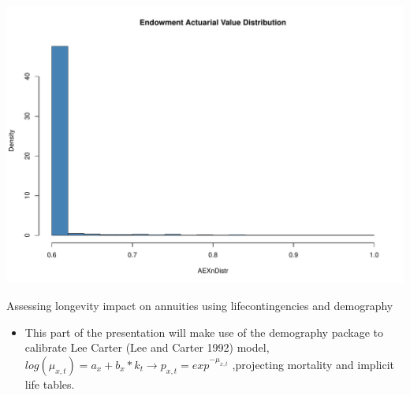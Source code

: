 \begin{frame}

\includegraphics{introToLifecontingencies_files/figure-beamer/AEXn2-1.pdf}

\end{frame}

\begin{frame}[fragile]{Assessing longevity impact on annuities using
lifecontingencies and demography}

\begin{itemize}[<+->]
\itemsep1pt\parskip0pt
\item
  This part of the presentation will make use of the demography package
  to calibrate Lee Carter (Lee and Carter 1992) model,
  \(log\left(\mu_{x,t} \right) =a_{x}+b_{x}*k_{t}\rightarrow p_{x,t}=exp^{-\mu_{x,t}}\)
  ,projecting mortality and implicit life tables.
\end{itemize}

\begin{Shaded}
\begin{Highlighting}[]
\NormalTok{(}\NormalTok{) }
\end{Highlighting}
\end{Shaded}

\end{frame}

